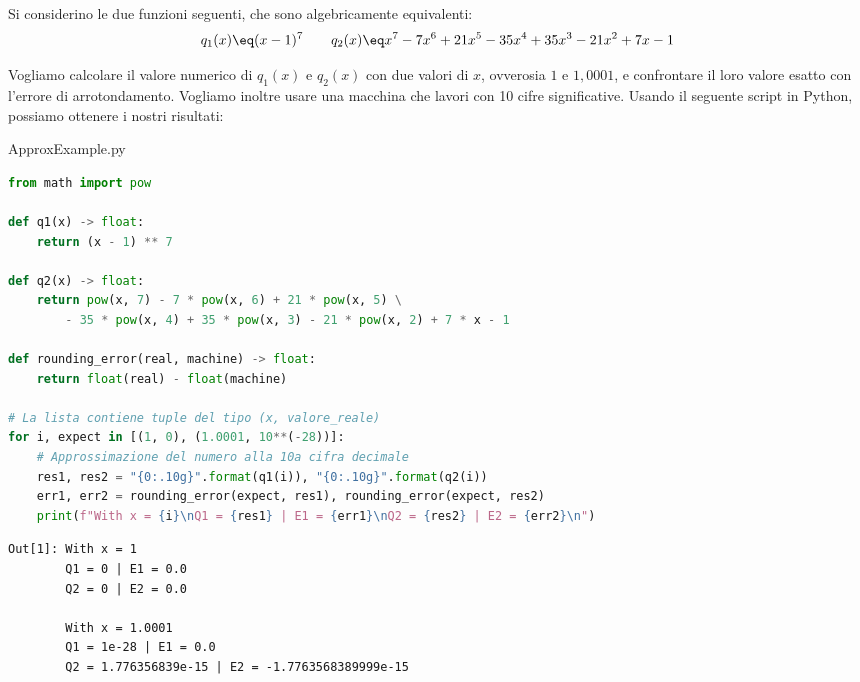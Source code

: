 \begin{example}
    Si considerino le due funzioni seguenti, che sono algebricamente equivalenti:
    \[ q_1(x) \eq (x - 1)^7 \quad \quad q_2(x) \eq x^7 - 7x^6 + 21x^5 - 35x^4 + 35x^3 - 21x^2 + 7x - 1 \]

    Vogliamo calcolare il valore numerico di $q_1(x)$ e $q_2(x)$ con due valori di $x$, ovverosia $1$ e $1,0001$, e confrontare il loro valore esatto con l'errore di arrotondamento. Vogliamo inoltre usare una macchina che lavori con 10 cifre significative. Usando il seguente script in Python, possiamo ottenere i nostri risultati:
    \begin{codeblock}{ApproxExample.py}
        \begin{lstlisting}[language = Python, numbers = none]
from math import pow

def q1(x) -> float:
    return (x - 1) ** 7

def q2(x) -> float:
    return pow(x, 7) - 7 * pow(x, 6) + 21 * pow(x, 5) \
        - 35 * pow(x, 4) + 35 * pow(x, 3) - 21 * pow(x, 2) + 7 * x - 1

def rounding_error(real, machine) -> float:
    return float(real) - float(machine)

# La lista contiene tuple del tipo (x, valore_reale)
for i, expect in [(1, 0), (1.0001, 10**(-28))]:
    # Approssimazione del numero alla 10a cifra decimale
    res1, res2 = "{0:.10g}".format(q1(i)), "{0:.10g}".format(q2(i))
    err1, err2 = rounding_error(expect, res1), rounding_error(expect, res2)
    print(f"With x = {i}\nQ1 = {res1} | E1 = {err1}\nQ2 = {res2} | E2 = {err2}\n")\end{lstlisting}
        \nl
        \begin{tcolorbox}[colback = black!95!Periwinkle!90]
            \begin{lstlisting}[style = notexterm]
Out[1]: With x = 1
        Q1 = 0 | E1 = 0.0
        Q2 = 0 | E2 = 0.0

        With x = 1.0001
        Q1 = 1e-28 | E1 = 0.0
        Q2 = 1.776356839e-15 | E2 = -1.7763568389999e-15\end{lstlisting}
        \end{tcolorbox}
    \end{codeblock}
\end{example}
